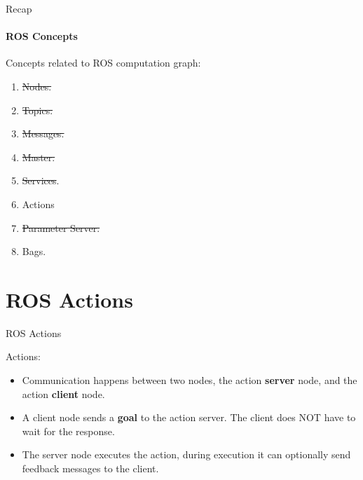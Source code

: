 \documentclass{beamer}
\begin{document}
\begin{frame}{Recap}
    \framesubtitle{ROS Concepts}
    
    Concepts related to ROS computation graph:
    
    \begin{enumerate}
        \item \sout{Nodes.}  \checkmark
        \item \sout{Topics.} \checkmark
        \item \sout{Messages.} \checkmark
        \item \sout{Master.} \checkmark
        \item \sout{Services}. \checkmark
        \item Actions
        \item \sout{Parameter Server.} \checkmark
        \item Bags.
    \end{enumerate}
\end{frame}

\section{ROS Actions}

\begin{frame}{ROS Actions}

    {\huge Actions:}
    \vspace{0.2cm}
    \begin{itemize}
        \item Communication happens between two nodes, the action \textbf{server} node, and the action \textbf{client} node.
        
        \vspace{2mm}
        
        \item A client node sends a \textbf{goal} to the action server. The client does NOT have to wait for the response.
        
        \vspace{2mm}
        
        \item The server node executes the action, during execution it can optionally send feedback messages to the client.
        
    \end{itemize}  
\end{frame}
\end{document}
